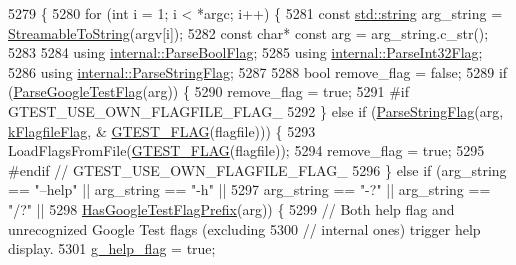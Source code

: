 \begin{DoxyCode}
5279                                                               \{
5280   \textcolor{keywordflow}{for} (\textcolor{keywordtype}{int} i = 1; i < *argc; i++) \{
5281     \textcolor{keyword}{const} \hyperlink{namespacetesting_1_1internal_a8e8ff5b11e64078831112677156cb111}{std::string} arg\_string = \hyperlink{namespacetesting_1_1internal_aad4beed95d0846e6ffc5da0978ef3bb9}{StreamableToString}(argv[i]);
5282     \textcolor{keyword}{const} \textcolor{keywordtype}{char}* \textcolor{keyword}{const} arg = arg\_string.c\_str();
5283 
5284     \textcolor{keyword}{using} \hyperlink{namespacetesting_1_1internal_ada3b98e7cfe93f4ba2053c470d9e3e51}{internal::ParseBoolFlag};
5285     \textcolor{keyword}{using} \hyperlink{namespacetesting_1_1internal_ae3449e173767750b613114ceac6d916a}{internal::ParseInt32Flag};
5286     \textcolor{keyword}{using} \hyperlink{namespacetesting_1_1internal_aa4ce312efaaf7a97aac2303173afe021}{internal::ParseStringFlag};
5287 
5288     \textcolor{keywordtype}{bool} remove\_flag = \textcolor{keyword}{false};
5289     \textcolor{keywordflow}{if} (\hyperlink{namespacetesting_1_1internal_afccff08aa2b1ede0dd32c1364a5dee42}{ParseGoogleTestFlag}(arg)) \{
5290       remove\_flag = \textcolor{keyword}{true};
5291 \textcolor{preprocessor}{#if GTEST\_USE\_OWN\_FLAGFILE\_FLAG\_}
5292     \} \textcolor{keywordflow}{else} \textcolor{keywordflow}{if} (\hyperlink{namespacetesting_1_1internal_aa4ce312efaaf7a97aac2303173afe021}{ParseStringFlag}(arg, \hyperlink{namespacetesting_1_1internal_aa1ffe15dea227d4dded912e43a8eed84}{kFlagfileFlag}, &
      \hyperlink{gtest-port_8h_a828f4e34a1c4b510da50ec1563e3562a}{GTEST\_FLAG}(flagfile))) \{
5293       LoadFlagsFromFile(\hyperlink{gtest-port_8h_a828f4e34a1c4b510da50ec1563e3562a}{GTEST\_FLAG}(flagfile));
5294       remove\_flag = \textcolor{keyword}{true};
5295 \textcolor{preprocessor}{#endif  // GTEST\_USE\_OWN\_FLAGFILE\_FLAG\_}
5296     \} \textcolor{keywordflow}{else} \textcolor{keywordflow}{if} (arg\_string == \textcolor{stringliteral}{"--help"} || arg\_string == \textcolor{stringliteral}{"-h"} ||
5297                arg\_string == \textcolor{stringliteral}{"-?"} || arg\_string == \textcolor{stringliteral}{"/?"} ||
5298                \hyperlink{namespacetesting_1_1internal_a6fff795269f50673e358438721710d6f}{HasGoogleTestFlagPrefix}(arg)) \{
5299       \textcolor{comment}{// Both help flag and unrecognized Google Test flags (excluding}
5300       \textcolor{comment}{// internal ones) trigger help display.}
5301       \hyperlink{namespacetesting_1_1internal_a93a772f5e51973b105d91cbb66a203f4}{g\_help\_flag} = \textcolor{keyword}{true};

\end{DoxyCode}
